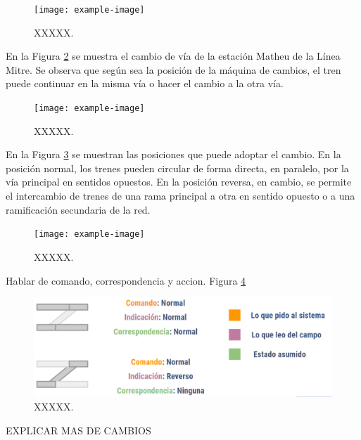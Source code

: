     \begin{figure}[!h]
        \centering
        \texttt{[image: example-image]}
        \centering\caption{XXXXX.}
        \label{fig:cambios_1}
    \end{figure}

    En la Figura \ref{fig:cambios_2} se muestra el cambio de vía de la estación Matheu de la Línea Mitre. Se observa que según sea la posición de la máquina de cambios, el tren puede continuar en la misma vía o hacer el cambio a la otra vía.

    \begin{figure}[!h]
        \centering
        \texttt{[image: example-image]}
        \centering\caption{XXXXX.}
        \label{fig:cambios_2}
    \end{figure}

    En la Figura \ref{fig:cambios_3} se muestran las posiciones que puede adoptar el cambio. En la posición normal, los trenes pueden circular de forma directa, en paralelo, por la vía principal en sentidos opuestos. En la posición reversa, en cambio, se permite el intercambio de trenes de una rama principal a otra en sentido opuesto o a una ramificación secundaria de la red.

    \begin{figure}[!h]
        \centering
        \texttt{[image: example-image]}
        \centering\caption{XXXXX.}
        \label{fig:cambios_3}
    \end{figure}

    Hablar de comando, correspondencia y accion. Figura \ref{fig:cambios_4}

    \lipsum[1]
    
    \begin{figure}[!h]
        \centering
        \includegraphics[width=1\textwidth]{Figuras/cambios}
        \centering\caption{XXXXX.}
        \label{fig:cambios_4}
    \end{figure}

EXPLICAR MAS DE CAMBIOS